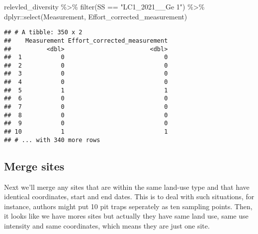 \documentclass[
]{article}
\newenvironment{Shaded}{\begin{snugshade}}{\end{snugshade}}
\newcommand{\FunctionTok}[1]{\textcolor[rgb]{0.00,0.00,0.00}{#1}}
\newcommand{\NormalTok}[1]{#1}
\newcommand{\SpecialCharTok}[1]{\textcolor[rgb]{0.00,0.00,0.00}{#1}}
\newcommand{\StringTok}[1]{\textcolor[rgb]{0.31,0.60,0.02}{#1}}
\begin{document}
\begin{Shaded}
\begin{Highlighting}[]
\NormalTok{relevled\_diversity }\SpecialCharTok{\%\textgreater{}\%} 
  \FunctionTok{filter}\NormalTok{(SS }\SpecialCharTok{==} \StringTok{"LC1\_2021\_\_Ge 1"}\NormalTok{) }\SpecialCharTok{\%\textgreater{}\%} 
\NormalTok{  dplyr}\SpecialCharTok{::}\FunctionTok{select}\NormalTok{(Measurement, Effort\_corrected\_measurement)}
\end{Highlighting}
\end{Shaded}

\begin{verbatim}
## # A tibble: 350 x 2
##    Measurement Effort_corrected_measurement
##          <dbl>                        <dbl>
##  1           0                            0
##  2           0                            0
##  3           0                            0
##  4           0                            0
##  5           1                            1
##  6           0                            0
##  7           0                            0
##  8           0                            0
##  9           0                            0
## 10           1                            1
## # ... with 340 more rows
\end{verbatim}

\hypertarget{merge-sites}{%
\subsection{Merge sites}\label{merge-sites}}

Next we'll merge any sites that are within the same land-use type and
that have identical coordinates, start and end dates. This is to deal
with such situations, for instance, authors might put 10 pit traps
seperately as ten sampling points. Then, it looks like we have mores
sites but actually they have same land use, same use intensity and same
coordinates, which means they are just one site.
\end{document}
